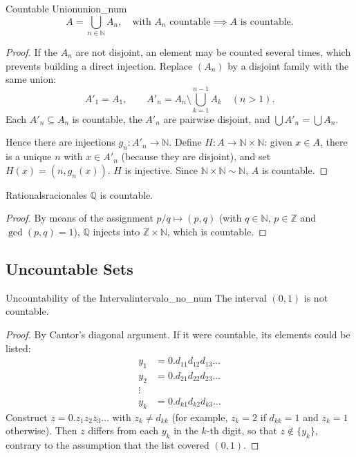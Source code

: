 \documentclass[11pt, a4paper]{article}
\begin{document}
\begin{teorema}{Countable Union}{union_num}
$$ A = \bigcup_{n \in \mathbb{N}} A_n, \quad \text{with } A_n \text{ countable} \implies A
\text{ is countable.} $$
\end{teorema}
\begin{proof}
If the $A_n$ are not disjoint, an element may be counted several times, which prevents building
a direct injection. Replace $(A_n)$ by a disjoint family with the same union:
$$ A'_1 = A_1, \qquad A'_n = A_n \setminus \bigcup_{k=1}^{n-1} A_k \quad (n > 1). $$
Each $A'_n \subseteq A_n$ is countable, the $A'_n$ are pairwise disjoint, and
$\bigcup A'_n = \bigcup A_n$.

Hence there are injections $g_n: A'_n \to \mathbb{N}$. Define
$H: A \to \mathbb{N} \times \mathbb{N}$: given $x \in A$, there is a unique $n$ with $x \in A'_n$ (because
they are disjoint), and set $H(x) = (n, g_n(x))$. $H$ is injective. Since
$\mathbb{N} \times \mathbb{N} \sim \mathbb{N}$, $A$ is countable.
\end{proof}

\begin{teorema}{Rationals}{racionales}
$\mathbb{Q}$ is countable.
\end{teorema}
\begin{proof}
By means of the assignment $p/q \mapsto (p, q)$ (with $q \in \mathbb{N}$, $p \in \mathbb{Z}$ and $\gcd(p,q)=1$),
$\mathbb{Q}$ injects into $\mathbb{Z} \times \mathbb{N}$, which is countable.
\end{proof}

\subsection{Uncountable Sets}

\begin{teorema}{Uncountability of the Interval}{intervalo_no_num}
The interval $(0,1)$ is not countable.
\end{teorema}

\begin{proof}
By Cantor's diagonal argument. If it were countable, its elements could be listed:
\begin{align*}
y_1 &= 0.d_{11}d_{12}d_{13}\dots \\
y_2 &= 0.d_{21}d_{22}d_{23}\dots \\
\vdots & \\
y_k &= 0.d_{k1}d_{k2}d_{k3}\dots
\end{align*}
Construct $z = 0.z_1z_2z_3\dots$ with $z_k \ne d_{kk}$ (for example, $z_k = 2$ if $d_{kk}=1$ and
$z_k = 1$ otherwise). Then $z$ differs from each $y_k$ in the $k$-th digit, so that
$z \notin \{y_k\}$, contrary to the assumption that the list covered $(0,1)$.
\end{proof}
\end{document}
